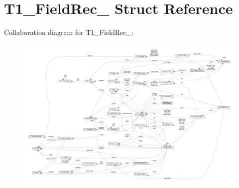 \hypertarget{structT1__FieldRec__}{}\section{T1\+\_\+\+Field\+Rec\+\_\+ Struct Reference}
\label{structT1__FieldRec__}


Collaboration diagram for T1\+\_\+\+Field\+Rec\+\_\+\+:
\nopagebreak
\begin{figure}[H]
\begin{center}
\leavevmode
\includegraphics[width=350pt]{structT1__FieldRec____coll__graph}
\end{center}
\end{figure}
